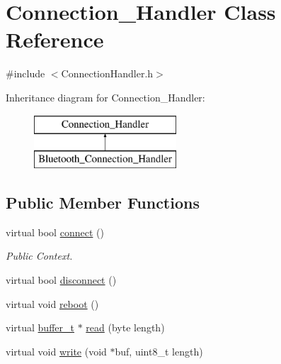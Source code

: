 \hypertarget{class_connection___handler}{\section{\-Connection\-\_\-\-Handler \-Class \-Reference}
\label{class_connection___handler}
}


{\ttfamily \#include $<$\-Connection\-Handler.\-h$>$}

\-Inheritance diagram for \-Connection\-\_\-\-Handler\-:\begin{figure}[H]
\begin{center}
\leavevmode
\includegraphics[height=2.000000cm]{class_connection___handler}
\end{center}
\end{figure}
\subsection*{\-Public \-Member \-Functions}
\begin{DoxyCompactItemize}
\item 
virtual bool \hyperlink{class_connection___handler_a391d131d7d802a8242080a6f44fdd348}{connect} ()
\begin{DoxyCompactList}\small\item\em \-Public \-Context. \end{DoxyCompactList}\item 
virtual bool \hyperlink{class_connection___handler_a7f266dbbf5c3f030de9a4732bdb17bd1}{disconnect} ()
\item 
virtual void \hyperlink{class_connection___handler_a0c565c93a515e30aca7c5fdf5bd7191e}{reboot} ()
\item 
virtual \hyperlink{structbuffer__t}{buffer\-\_\-t} $\ast$ \hyperlink{class_connection___handler_a5cdbdd2b6451b80ef35580ee8b57fce3}{read} (byte length)
\item 
virtual void \hyperlink{class_connection___handler_a83c508842b867b95590df79417147289}{write} (void $\ast$buf, uint8\-\_\-t length)
\end{DoxyCompactItemize}
